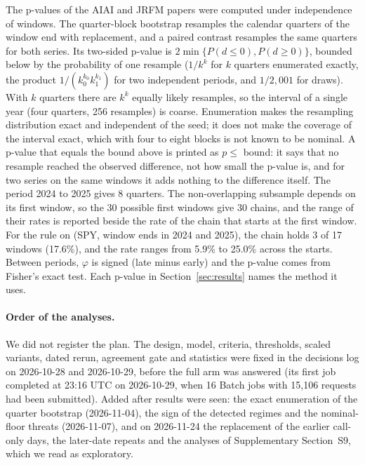 The p-values of the AIAI and JRFM papers \cite{regan2026regimes,regan2026jrfm} were computed under independence of windows. The quarter-block bootstrap resamples the calendar quarters of the window end with replacement, and a paired contrast resamples the same quarters for both series. Its two-sided p-value is $2\min\{P(d\le 0),P(d\ge 0)\}$, bounded below by the probability of one resample ($1/k^k$ for $k$ quarters enumerated exactly, the product $1/(k_0^{k_0}k_1^{k_1})$ for two independent periods, and $1/2{,}001$ for draws). With $k$ quarters there are $k^k$ equally likely resamples, so the interval of a single year (four quarters, 256 resamples) is coarse. Enumeration makes the resampling distribution exact and independent of the seed; it does not make the coverage of the interval exact, which with four to eight blocks is not known to be nominal. A p-value that equals the bound above is printed as $p\le$ bound: it says that no resample reached the observed difference, not how small the p-value is, and for two series on the same windows it adds nothing to the difference itself. The period 2024 to 2025 gives 8 quarters. The non-overlapping subsample depends on its first window, so the 30 possible first windows give 30 chains, and the range of their rates is reported beside the rate of the chain that starts at the first window. For the rule on  (SPY, window ends in 2024 and 2025), the chain holds 3 of 17 windows (17.6\%), and the rate ranges from 5.9\% to 25.0\% across the starts. Between periods, $\varphi$ is signed (late minus early) and the p-value comes from Fisher's exact test. Each p-value in Section~\ref{sec:results} names the method it uses.

\paragraph{Order of the analyses.} We did not register the plan. The design, model, criteria, thresholds, scaled variants, dated rerun, agreement gate and statistics were fixed in the decisions log on 2026-10-28 and 2026-10-29, before the full  arm was answered (its first job completed at 23:16 UTC on 2026-10-29, when 16 Batch jobs with 15{,}106 requests had been submitted). Added after results were seen: the exact enumeration of the quarter bootstrap (2026-11-04), the sign of the detected regimes and the nominal-floor threats (2026-11-07), and on 2026-11-24 the replacement of the earlier call-only days, the later-date repeats and the analyses of Supplementary Section~S9, which we read as exploratory.

